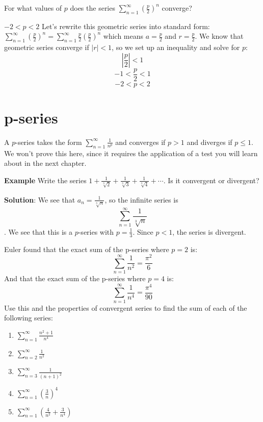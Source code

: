 \begin{Exercise}[label = geo3]
For what values of $p$ does the series $\sum_{n = 1}^\infty \left( \frac{p}{2} 
\right) ^ n$ converge?
\end{Exercise}

\begin{Answer}[ref = geo3]
$-2 < p < 2$ Let's rewrite this geometric series into standard form: $\sum_{n 
= 1}^\infty \left( \frac{p}{2} \right) ^ n = \sum_{n = 1}^\infty \frac{p}{2} 
\left( \frac{p}{2} \right) ^ n$ which means $a = \frac{p}{2}$ and $r = 
\frac{p}{2}$. We know that geometric series converge if $\left| r \right| < 
1$, so we set up an inequality and solve for $p$:
$$\left| \frac{p}{2} \right| < 1$$
$$-1 < \frac{p}{2} < 1$$
$$-2 < p < 2$$
\end{Answer}

\section{p-series}
A $p$-series takes the form $\sum_{n=1}^\infty \frac{1}{n^p}$ and converges 
if $p > 1$ and diverges if $p \leq 1$. We won't prove this here, since it 
requires the application of a test you will learn about in the next chapter. 

\textbf{Example} Write the series $1 + \frac{1}{\sqrt[3]{2}} + \frac{1}{
\sqrt[3]{3}} + \frac{1}{\sqrt[3]{4}} + \cdots$. Is it convergent or divergent?

\textbf{Solution}: We see that $a_n = \frac{1}{\sqrt[3]{n}}$, so the 
infinite series is $$\sum_{n=1}^\infty \frac{1}{\sqrt[3]{n}}$$. 
We see that this is a $p$-series with $p = \frac{1}{3}$. Since $p < 1$, the 
series is divergent. 

\begin{Exercise}[label = euler1]
Euler found that the exact sum of the p-series where $p=2$ is:
$$\sum_{n=1}^\infty \frac{1}{n^2} = \frac{\pi^2}{6}$$
And that the exact sum of the p-series where $p=4$ is:
$$\sum_{n=1}^\infty \frac{1}{n^4} = \frac{\pi^4}{90}$$
Use this and the properties of convergent series to find the sum of each of 
the following series:
\begin{enumerate}
\item $\sum_{n=1}^\infty \frac{n^2 + 1}{n^4}$
\item $\sum_{n=2}^\infty \frac{1}{n^2}$
\item $\sum_{n=3}^\infty \frac{1}{(n + 1)^2}$
\item $\sum_{n=1}^\infty \left( \frac{3}{n} \right)^4$
\item $\sum_{n=1}^\infty \left( \frac{4}{n^2} + \frac{3}{n^4} \right)$
\end{enumerate}
\vspace{50mm}
\end{Exercise}

